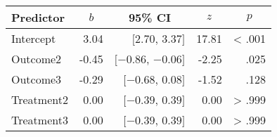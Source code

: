 \documentclass[english,man]{apa6}
\begin{document}
\begin{table}[tbp]

\begin{center}
\begin{threeparttable}

\caption{\label{tab:unnamed-chunk-17}}

\begin{tabular}{lrrrr}
\toprule
Predictor & \multicolumn{1}{c}{$b$} & \multicolumn{1}{c}{95\% CI} & \multicolumn{1}{c}{$z$} & \multicolumn{1}{c}{$p$}\\
\midrule
Intercept & 3.04 & $[2.70$, $3.37]$ & 17.81 & < .001\\
Outcome2 & -0.45 & $[-0.86$, $-0.06]$ & -2.25 & .025\\
Outcome3 & -0.29 & $[-0.68$, $0.08]$ & -1.52 & .128\\
Treatment2 & 0.00 & $[-0.39$, $0.39]$ & 0.00 & > .999\\
Treatment3 & 0.00 & $[-0.39$, $0.39]$ & 0.00 & > .999\\
\bottomrule
\end{tabular}

\end{threeparttable}
\end{center}

\end{table}
\end{document}
